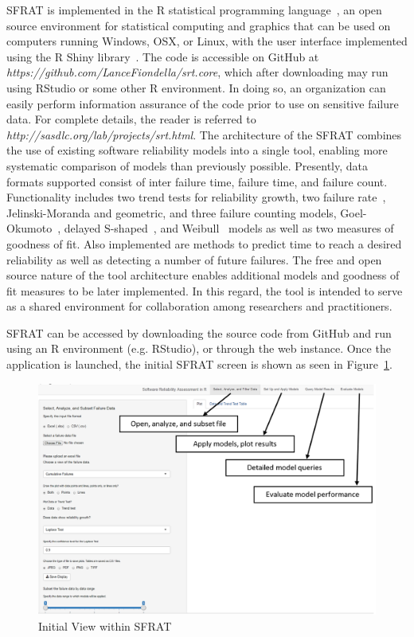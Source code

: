 \documentclass[conference]{IEEEtran}
\begin{document}
SFRAT is implemented in the R statistical programming language~\cite{}, an open source environment for statistical computing and graphics that can be used on computers running Windows, OSX, or Linux, with the user interface implemented using the R Shiny library~\cite{}. The code is accessible on GitHub at \textit{https://github.com/LanceFiondella/srt.core}, which after downloading may run using RStudio or some other R environment. In doing so, an organization can easily perform information assurance of the code prior to use on sensitive failure data. For complete details, the reader is referred to \textit{http://sasdlc.org/lab/projects/srt.html}.
The architecture of the SFRAT combines the use of existing software reliability models into a single tool, enabling more systematic comparison of models than previously possible. Presently, data formats supported consist of inter failure time, failure time, and failure count. Functionality includes two trend tests for reliability growth, two failure rate~\cite{BookHoSRE}, Jelinski-Moranda and geometric, and three failure counting models, Goel-Okumoto~\cite{goel1985software}, delayed S-shaped~\cite{artTR1986_19}, and Weibull~\cite{artNHPPsurvey} models as well as two measures of goodness of fit. Also implemented are methods to predict time to reach a desired reliability as well as detecting a number of future failures. The free and open source nature of the tool architecture enables additional models and goodness of fit measures to be later implemented. In this regard, the tool is intended to serve as a shared environment for collaboration among researchers and practitioners.

SFRAT can be accessed by downloading the source code from GitHub and run using an R environment (e.g. RStudio), or through the web instance. Once the application is launched, the initial SFRAT screen is shown as seen in Figure~\ref{fig_DefaultView}.
\begin{figure}[!h]
\centering
\includegraphics[width=\columnwidth]{Figures/DefaultView}
\caption{Initial View within SFRAT}
\label{fig_DefaultView}
\end{figure}
\end{document}
